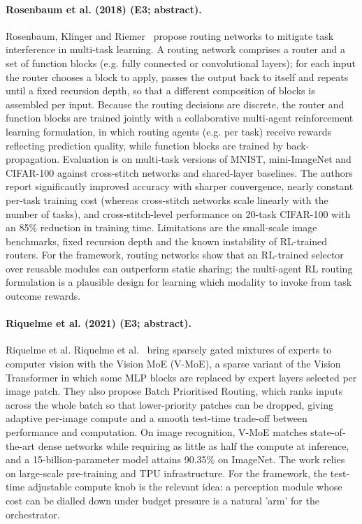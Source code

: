 \documentclass[10pt,a4paper]{article}
\begin{document}
\paragraph{Rosenbaum et al. (2018) (E3; abstract).} Rosenbaum, Klinger and Riemer~\cite{Rosenbaum2018} propose routing networks to mitigate task interference in multi-task learning. A routing network comprises a router and a set of function blocks (e.g. fully connected or convolutional layers); for each input the router chooses a block to apply, passes the output back to itself and repeats until a fixed recursion depth, so that a different composition of blocks is assembled per input. Because the routing decisions are discrete, the router and function blocks are trained jointly with a collaborative multi-agent reinforcement learning formulation, in which routing agents (e.g. per task) receive rewards reflecting prediction quality, while function blocks are trained by back-propagation. Evaluation is on multi-task versions of MNIST, mini-ImageNet and CIFAR-100 against cross-stitch networks and shared-layer baselines. The authors report significantly improved accuracy with sharper convergence, nearly constant per-task training cost (whereas cross-stitch networks scale linearly with the number of tasks), and cross-stitch-level performance on 20-task CIFAR-100 with an 85\% reduction in training time. Limitations are the small-scale image benchmarks, fixed recursion depth and the known instability of RL-trained routers. For the framework, routing networks show that an RL-trained selector over reusable modules can outperform static sharing; the multi-agent RL routing formulation is a plausible design for learning which modality to invoke from task outcome rewards.

\paragraph{Riquelme et al. (2021) (E3; abstract).} Riquelme et al. Riquelme et al.~\cite{Riquelme2021} bring sparsely gated mixtures of experts to computer vision with the Vision MoE (V-MoE), a sparse variant of the Vision Transformer in which some MLP blocks are replaced by expert layers selected per image patch. They also propose Batch Prioritised Routing, which ranks inputs across the whole batch so that lower-priority patches can be dropped, giving adaptive per-image compute and a smooth test-time trade-off between performance and computation. On image recognition, V-MoE matches state-of-the-art dense networks while requiring as little as half the compute at inference, and a 15-billion-parameter model attains 90.35\% on ImageNet. The work relies on large-scale pre-training and TPU infrastructure. For the framework, the test-time adjustable compute knob is the relevant idea: a perception module whose cost can be dialled down under budget pressure is a natural 'arm' for the orchestrator.
\end{document}
